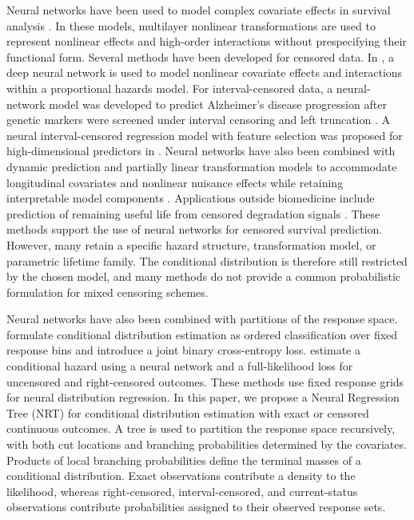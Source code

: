 \documentclass[11pt]{article}
\numberwithin{equation}{section}
\begin{document}
Neural networks have been used to model complex covariate effects in survival analysis \citep{sun_neural_2023,liu_neural_2025,gao_neural_2025,yuan_interpretable_2026}. In these models, multilayer nonlinear transformations are used to represent nonlinear effects and high-order interactions without prespecifying their functional form. Several methods have been developed for censored data. In \cite{katzman_deepsurv_2018}, a deep neural network is used to model nonlinear covariate effects and interactions within a proportional hazards model. For interval-censored data, a neural-network model was developed to predict Alzheimer's disease progression after genetic markers were screened under interval censoring and left truncation \cite{sun_neural_2023}. A neural interval-censored regression model with feature selection was proposed for high-dimensional predictors in \cite{meixide_neural_2024}. Neural networks have also been combined with dynamic prediction and partially linear transformation models to accommodate longitudinal covariates and nonlinear nuisance effects while retaining interpretable model components \citep{liu_neural_2025,yuan_interpretable_2026}. Applications outside biomedicine include prediction of remaining useful life from censored degradation signals \citep{gao_neural_2025}. These methods support the use of neural networks for censored survival prediction. However, many retain a specific hazard structure, transformation model, or parametric lifetime family. The conditional distribution is therefore still restricted by the chosen model, and many methods do not provide a common probabilistic formulation for mixed censoring schemes.

Neural networks have also been combined with partitions of the response space. \citet{li_deep_2021} formulate conditional distribution estimation as ordered classification over fixed response bins and introduce a joint binary cross-entropy loss. \citet{hu_conditional_2023} estimate a conditional hazard using a neural network and a full-likelihood loss for uncensored and right-censored outcomes. These methods use fixed response grids for neural distribution regression. In this paper, we propose a Neural Regression Tree (NRT) for conditional distribution estimation with exact or censored continuous outcomes. A tree is used to partition the response space recursively, with both cut locations and branching probabilities determined by the covariates. Products of local branching probabilities define the terminal masses of a conditional distribution. Exact observations contribute a density to the likelihood, whereas right-censored, interval-censored, and current-status observations contribute probabilities assigned to their observed response sets.
\end{document}
